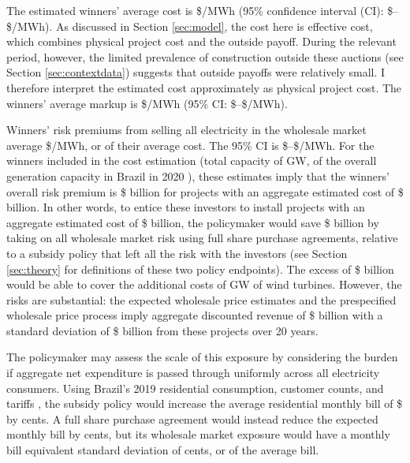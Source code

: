 \documentclass[12pt]{article}
\theoremstyle{definition} %
\begin{document}
The estimated winners' average cost is \$/MWh (95\% confidence interval (CI): \$--\$/MWh). As discussed in Section \ref{sec:model}, the cost here is effective cost, which combines physical project cost and the outside payoff. During the relevant period, however, the limited prevalence of construction outside these auctions (see Section \ref{sec:contextdata}) suggests that outside payoffs were relatively small. I therefore interpret the estimated cost approximately as physical project cost. The winners' average markup is \$/MWh (95\% CI: \$--\$/MWh).

Winners' risk premiums from selling all electricity in the wholesale market average \$/MWh, or  of their average cost. The 95\% CI is \$--\$/MWh. For the  winners included in the cost estimation (total capacity of  GW,  of the overall generation capacity in Brazil in 2020 \citep{Tolmasquim2021}), these estimates imply that the winners' overall risk premium is \$ billion for projects with an aggregate estimated cost of \$ billion. In other words, to entice these investors to install projects with an aggregate estimated cost of \$ billion, the policymaker would save \$ billion by taking on all wholesale market risk using full share purchase agreements, relative to a subsidy policy that left all the risk with the investors (see Section \ref{sec:theory} for definitions of these two policy endpoints). The excess of \$ billion would be able to cover the additional costs of  GW of wind turbines. However, the risks are substantial: the expected wholesale price estimates and the prespecified wholesale price process imply aggregate discounted revenue of \$ billion with a standard deviation of \$ billion from these projects over 20 years.

The policymaker may assess the scale of this exposure by considering the burden if aggregate net expenditure is passed through uniformly across all electricity consumers. Using Brazil's 2019 residential consumption, customer counts, and tariffs \citep{EPE2021}, the subsidy policy would increase the average residential monthly bill of \$ by  cents. A full share purchase agreement would instead reduce the expected monthly bill by  cents, but its wholesale market exposure would have a monthly bill equivalent standard deviation of  cents, or  of the average bill.
\end{document}
